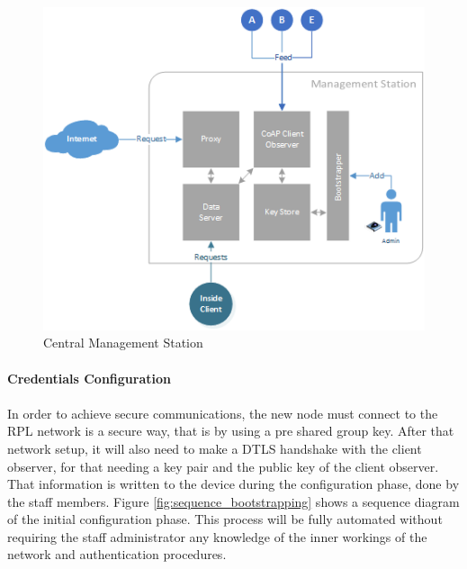 \begin{figure}[h]
  \centering
  \includegraphics[width=0.8\linewidth]{figures/White_Box_Model.png}
  \caption{Central Management Station}
  \label{fig:core_components}
\end{figure}

\paragraph{\textbf{Credentials Configuration}}
\paragraph{}

In order to achieve secure communications, the new node must connect to the RPL network is a secure way, that is by using a pre shared group key. After that network setup, it will also need to make a DTLS handshake with the client observer, for that needing a key pair and the public key of the client observer. That information is written to the device during the configuration phase, done by the staff members. Figure \ref{fig:sequence_bootstrapping} shows a sequence diagram of the initial configuration phase. This process will be fully automated without requiring the staff administrator any knowledge of the inner workings of the network and authentication procedures.

